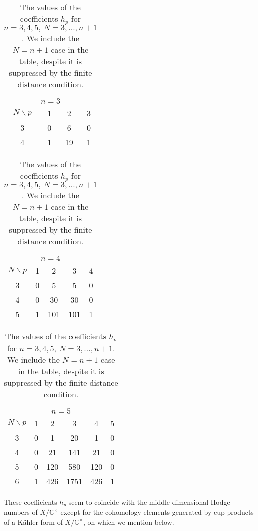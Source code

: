 \documentclass[a4paper,12pt]{article}
\numberwithin{equation}{section}
\newcommand{\Cx}{{\mathbb C}^{\times}}
\begin{document}
\begin{table}
\begin{center}
 \begin{tabular}[t]{|c||c|c|c|}\hline
 \multicolumn{4}{|c|}{$n=3$}\\\hline\hline
 $N\backslash p$ &1 &2 &3 \\ \hline\hline
 3 &0 &6 &0 \\ \hline
 4 &1 &19 &1 \\ \hline
 \end{tabular}
 \begin{tabular}[t]{|c||c|c|c|c|}\hline
 \multicolumn{5}{|c|}{$n=4$}\\\hline\hline
 $N\backslash p$ &1 &2 &3 &4 \\ \hline\hline
 3 &0 &5 &5 &0 \\ \hline
 4 &0 &30 &30 &0 \\ \hline
 5 &1 &101 &101 &1 \\ \hline
 \end{tabular}
 \begin{tabular}[t]{|c||c|c|c|c|c|}\hline
 \multicolumn{6}{|c|}{$n=5$}\\\hline\hline
 $N\backslash p$ &1 &2 &3 &4 &5 \\ \hline\hline
 3 &0 &1 &20 &1 &0 \\ \hline
 4 &0 &21 &141 &21 &0 \\ \hline
 5 &0 &120 &580 &120 &0 \\ \hline 
 6 &1 &426 &1751 &426 &1 \\ \hline
\end{tabular}
\end{center}
\caption{The values of the coefficients $h_p$ for 
$n=3,4,5,\ N=3,\dots,n+1$. 
We include the $N=n+1$ case in the table, 
despite it is suppressed by the finite distance condition.
}\label{TableHP}
\end{table}
These coefficients $h_p$
seem to coincide with the middle dimensional Hodge numbers of $X/\Cx$
except for the cohomology elements generated by cup products of a
K\"ahler form of $X/\Cx$, on which we mention below.
 
\end{document}
